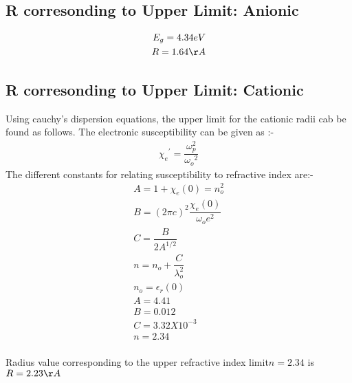 \documentclass[journal]{IEEEtran}
\begin{document}
\subsection{R corresonding to Upper Limit: Anionic}


\begin{align}
E_g = 4.34 eV                                                       \\
R = 1.64 \AA                                                   \\                                    
\end{align}
\subsection{R corresonding to Upper Limit: Cationic}
Using cauchy's dispersion equations, the upper limit for the cationic radii cab be found as follows.
The electronic susceptibility can be given as :-
\begin{align}
{\chi_e}^{'} = \dfrac{\omega_p^{2}}{{\omega_o}^{2}}
\end{align}
The different constants for relating susceptibility to refractive index are:-
\begin{align}
A = 1+ \chi_e(0) = n_o^{2} \\
B = (2 \pi c)^{2}\dfrac{\chi_e(0)}{\omega_oe^{2}} \\
C = \dfrac{B}{2 A^{1/2}} \\
n = n_o + \dfrac{C}{\lambda_o^{2}} \\
n_o = \epsilon_r(0) \\
A = 4.41 \\
B= 0.012 \\
C= 3.32 X 10^{-3} \\
n= 2.34  \\
\end{align}


Radius value corresponding to the upper refractive index limit$ n=2.34$ is $ R = 2.23 \AA $
\end{document}
